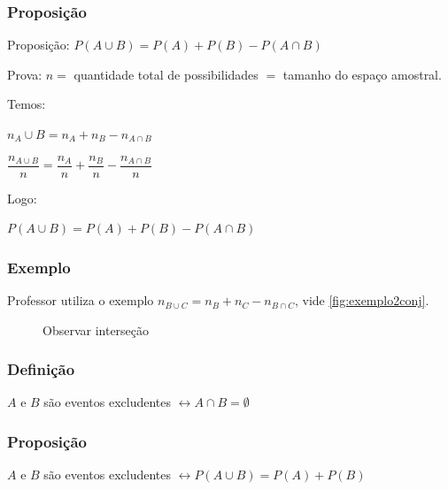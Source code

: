 \documentclass[a4paper]{article}
\begin{document}
	\subsubsection{Proposição}
	
	Proposição: $P(A \cup B) = P(A) + P(B) - P(A \cap B)$
	
	Prova: $n =$ quantidade total de possibilidades $=$ tamanho do espaço amostral.
	
	Temos:
	
	$n_A\cup B = n_A + n_B - n_{A \cap B}$
	
	$\dfrac{n_{A\cup B}}{n} = \dfrac{n_{A}}{n} + \dfrac{n_B}{n} - \dfrac{n_{A \cap B}}{n}$

	Logo:
	
	$P(A \cup B) = P(A) + P(B) - P(A \cap B)$
	
	\subsubsection{Exemplo}
	
	Professor utiliza o exemplo $n_{B \cup C} = n_{B} + n_{C} - n_{B \cap C}$, vide \autoref{fig:exemplo2conj}.
	
	\begin{figure}[h]
		\centering
		\caption{Observar interseção}
		\label{fig:exemplo2conj}
	\end{figure}
	
	\subsubsection{Definição}
	
	$A$ e $B$ são eventos excludentes \hspace{5mm} $\leftrightarrow A \cap B = \emptyset$
	
	\subsubsection{Proposição}
	
	$A$ e $B$ são eventos excludentes \hspace{5mm} $\leftrightarrow P(A \cup B) = P(A) + P(B)$
	
\end{document}
